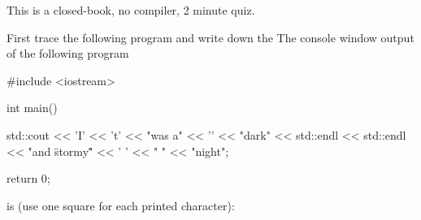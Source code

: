 


\usepackage[T1]{fontenc}  %
\usepackage{textcomp}     %
\usepackage{mathptmx}     %
                          
\renewcommand\AUTHOR{} %


\topmattertwo

This is a closed-book, no compiler, 2 minute quiz.

First trace the following program and write down the
The console window output of the following program
\begin{console}[fontsize=\small]
#include <iostream>

int main()
{
    std::cout << 'I' << 't' << "was a" << '\n' << "dark\n" 
              << std::endl << std::endl << "and  \"stormy\"" << ' ' << " " 
              << "night\n";
    
    return 0;
}
\end{console} 
is (use one square for each printed character):


